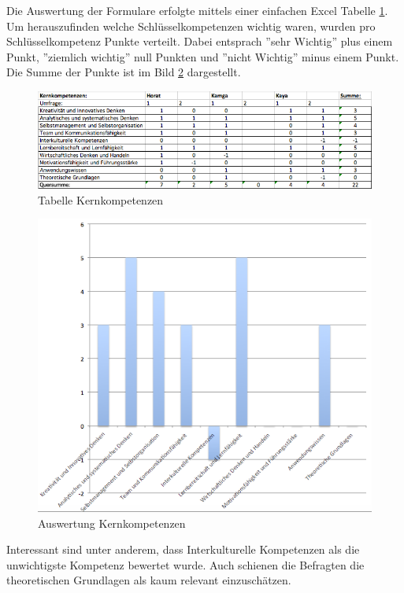 Die Auswertung der Formulare erfolgte mittels einer einfachen Excel Tabelle \ref{fig:tabkernkomp}. Um herauszufinden welche Schlüsselkompetenzen wichtig waren, wurden pro Schlüsselkompetenz Punkte verteilt. Dabei entsprach ''sehr Wichtig'' plus einem Punkt, ''ziemlich wichtig'' null Punkten und ''nicht Wichtig'' minus einem Punkt. Die Summe der Punkte ist im Bild \ref{fig:auswerkomp} dargestellt. 

\begin{figure}[ht]
	\centering
	\includegraphics[width=1.2\textwidth]{images/Tabelle_Kernkompetenzen.png}
	\caption{Tabelle Kernkompetenzen}
	\label{fig:tabkernkomp}
\end{figure}

\begin{figure}[ht]
	\centering
	\includegraphics[width=1.1\textwidth]{images/Auswertung_kernkompetenzen.png}
	\caption{Auswertung Kernkompetenzen}
	\label{fig:auswerkomp}
\end{figure}


Interessant sind unter anderem, dass Interkulturelle Kompetenzen als die unwichtigste Kompetenz bewertet wurde. Auch schienen die Befragten die theoretischen Grundlagen als kaum relevant einzuschätzen.

